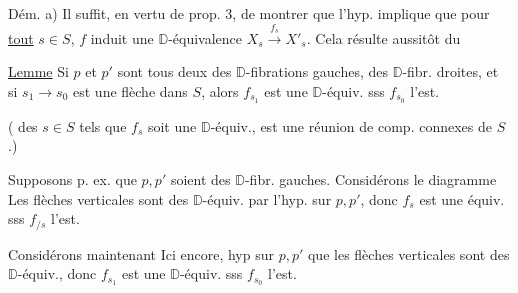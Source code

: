 
Dém. a) Il suffit, en vertu de prop. 3, de montrer que l'hyp. implique que pour \uline{tout} $s\in S$, $f$ induit une $\mathbb D$-équivalence $X_s\xrightarrow{f_s}X'_s$. Cela résulte  aussitôt du 

\uline{Lemme}  Si $p$ et $p'$ sont tous deux  des $\mathbb D$-fibrations gauches,  des $\mathbb D$-fibr. droites, et si $s_1\longrightarrow s_0$ est une flèche dans $S$, alors $f_{s_1}$ est une $\mathbb D$-équiv. sss $f_{s_0}$ l'est.

(  des $s\in S$ tels que $f_s$ soit une $\mathbb D$-équiv., est une réunion de comp. connexes de $S$.)

Supposons p. ex. que $p,p'$ soient des $\mathbb D$-fibr. gauches. Considérons  le diagramme
Les flèches verticales sont des $\mathbb D$-équiv. par l'hyp. sur $p,p'$, donc $f_s$ est une équiv. sss $f_{/s}$ l'est.

Considérons maintenant
Ici encore,  hyp sur $p,p'$  que les flèches verticales sont des $\mathbb D$-équiv., donc $f_{s_1}$ est une $\mathbb D$-équiv. sss $f_{s_0}$ l'est.
